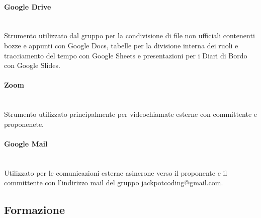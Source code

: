 \documentclass{article}
\begin{document}
\paragraph{Google Drive}~\\
Strumento utilizzato dal gruppo per la condivisione di file non ufficiali contenenti bozze e appunti con Google Docs, tabelle per la divisione interna dei ruoli e tracciamento del tempo con Google Sheets e presentazioni per i Diari di Bordo con Google Slides. 
\paragraph{Zoom}~\\
Strumento utilizzato principalmente per videochiamate esterne con committente e proponenete.
\paragraph{Google Mail}~\\
Utilizzato per le comunicazioni esterne asincrone verso il proponente e il committente con l'indirizzo mail del gruppo jackpotcoding@gmail.com.

\subsection{Formazione}
\end{document}
